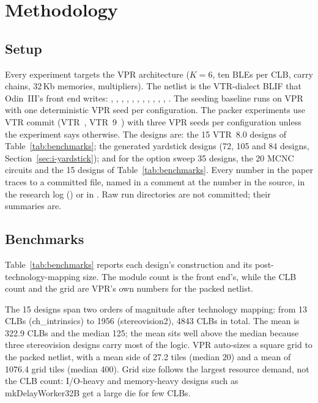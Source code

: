 \section{Methodology}
\label{sec:method}

\subsection{Setup}
\label{sec:setup}

Every experiment targets the VPR architecture  ($K=6$, ten BLEs per CLB, carry chains, 32\,Kb memories, multipliers). The netlist is the VTR-dialect BLIF that Odin~III's front end writes: , , , , , , , , , , , . The seeding baseline runs on VPR  with one deterministic VPR seed per configuration. The packer experiments use VTR commit  (VTR~\cite{rose2012vtr}, VTR~9~\cite{elgammal2025vtr9}) with three VPR seeds per configuration unless the experiment says otherwise. The designs are: the 15 VTR~8.0 designs of Table~\ref{tab:benchmarks}; the generated yardstick designs (72, 105 and 84 designs, Section~\ref{sec:i-yardstick}); and for the option sweep 35 designs, the 20 MCNC circuits and the 15 designs of Table~\ref{tab:benchmarks}. Every number in the paper traces to a committed file, named in a comment at the number in the source, in the research log () or in . Raw run directories are not committed; their summaries are.

\subsection{Benchmarks}
\label{sec:benchmarks}

Table~\ref{tab:benchmarks} reports each design's construction and its post-technology-mapping size. The module count is the front end's, while the CLB count and the grid are VPR's own numbers for the packed netlist.

The 15 designs span two orders of magnitude after technology mapping:
from 13 CLBs (ch\_intrinsics) to 1956 (stereovision2),
4843 CLBs in total. The mean is 322.9 CLBs and the median 125;
the mean sits well above the median because three stereovision designs carry most of the logic.
VPR auto-sizes a square grid to the packed netlist, with a mean side of 27.2 tiles
(median 20) and a mean of 1076.4 grid tiles (median
400). Grid size follows the largest resource demand, not the CLB count:
I/O-heavy and memory-heavy designs such as mkDelayWorker32B get a large die for few CLBs.

